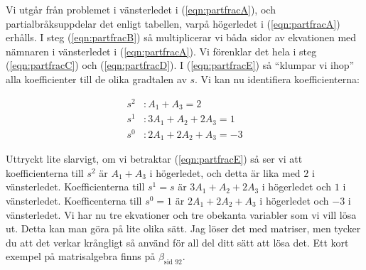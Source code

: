 \documentclass[a4paper]{article}
\newcommand{\mhb}[1]{$\beta_{\text{#1}}$}     %
\begin{document}
Vi utgår från problemet i vänsterledet i (\ref{eqn:partfracA}), och partialbråksuppdelar det enligt tabellen, varpå högerledet i (\ref{eqn:partfracA}) erhålls. I steg (\ref{eqn:partfracB}) så multiplicerar vi båda sidor av ekvationen med nämnaren i vänsterledet i (\ref{eqn:partfracA}). Vi förenklar det hela i steg (\ref{eqn:partfracC}) och (\ref{eqn:partfracD}). I (\ref{eqn:partfracE}) så ``klumpar vi ihop'' alla koefficienter till de olika gradtalen av $s$. Vi kan nu identifiera koefficienterna:

\begin{align*}
  s^2 &: A_1 + A_3 = 2\\
  s^1 &: 3A_1 + A_2 + 2A_3 = 1\\
  s^0 &: 2A_1 + 2A_2 + A_3 = -3
\end{align*}

Uttryckt lite slarvigt, om vi betraktar (\ref{eqn:partfracE}) så ser vi att koefficienterna till $s^2$ är $A_1 + A_3$ i högerledet, och detta är lika med $2$ i vänsterledet. Koefficienterna till $s^1 = s$ är $3A_1 + A_2 + 2A_3$ i högerledet och $1$ i vänsterledet. Koefficenterna till $s^0 = 1$ är $2A_1 + 2A_2 + A_3$ i högerledet och $-3$ i vänsterledet. Vi har nu tre ekvationer och tre obekanta variabler som vi vill lösa ut. Detta kan man göra på lite olika sätt. Jag löser det med matriser, men tycker du att det verkar krångligt så använd för all del ditt sätt att lösa det. Ett kort exempel på matrisalgebra finns på \mhb{sid 92}.
\end{document}
